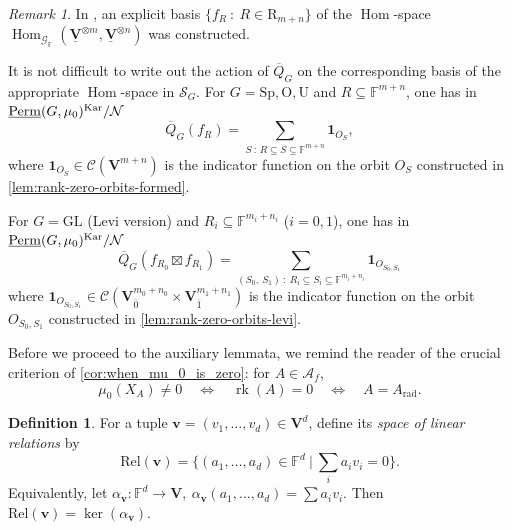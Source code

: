 \documentclass[11pt,a4paper]{amsart}
\theoremstyle{plain}%
\theoremstyle{definition}
\newtheorem{definition}[lemma]{Definition}
\theoremstyle{remark}
\newtheorem{remark}[lemma]{Remark}
\newcommand{\Hom}{\operatorname{Hom}}
\newcommand{\rk}{{\operatorname{rk}}}
\newcommand{\V}{\mathbf{V}}
\newcommand{\Perm}{\underline{{\rm Perm}}}
\newcommand{\F}{{\mathbb F}}
\newcommand{\one}{{\mathbf{1}}}
\newcommand{\Kar}{\mathrm{Kar}}
\newcommand{\rad}{\operatorname{rad}}
\newcommand{\N}{\mathcal N}
\newcommand{\boxt}{\mathbin{\boxtimes}}
\newcommand{\cC}{\mathcal{C}}
\begin{document}
\begin{remark}

In \cite{Knop, EAHGL}, an explicit basis $\{f_R~:~ R\in \mathrm{R}_{m+n}\}$ of the $\Hom$-space $\Hom_{{\mathscr{G}_{\F}}}(\underline{\V}^{\otimes m},
\underline{\V}^{\otimes n})$ was constructed. 

It is not difficult to write out the action of $\overline{Q}_G$ on the corresponding basis of the appropriate $\Hom$-space in $\mathscr{S}_G$. For $G=\mathrm{Sp},\mathrm O,\mathrm U$ and $R\subseteq \F^{m+n}$, one has in $\Perm(G, \mu_0)^{\Kar}/\N$
\begin{equation*}\label{eq:zeta-formula}
 \overline{Q}_G(f_R)=\sum_{S~:\,R\subseteq S\subseteq \F^{m+n}}\one_{O_S},
\end{equation*}
where $ \one_{O_S} \in \cC(\V^{m+n})$ is the indicator function on the orbit $O_S$ constructed in \cref{lem:rank-zero-orbits-formed}. 

For $G=\mathrm{GL}$ (Levi version) and $R_i\subseteq \F^{m_i+n_i}$ ($i=0,1$), one has in $\Perm(G, \mu_0)^{\Kar}/\N$
\begin{equation*}\label{eq:zeta-formula-product}
 \overline{Q}_G(f_{R_0}\boxt f_{R_1})
=\sum_{(S_0,~ S_1) ~:~ R_i\subseteq S_i\subseteq \F^{m_i+n_i}}
 \one_{O_{S_0,S_1}}
\end{equation*}
where $ \one_{O_{S_0,S_1}} \in \cC(\V_{\bar 0}^{ m_0+n_0}\times \V_{\bar 1}^{m_1+n_1})$ is the indicator function on the orbit $O_{S_0,S_1}$ constructed in \cref{lem:rank-zero-orbits-levi}. 


\end{remark}


Before we proceed to the auxiliary lemmata, we remind the reader of the crucial criterion of \cref{cor:when_mu_0_is_zero}: for $A\in \mathcal{A}_f$,
\begin{equation}
 \mu_0(X_A)\neq 0
 \quad\Longleftrightarrow\quad
 \rk(A)=0 \quad\Longleftrightarrow\quad A=A_{\rad}.
\end{equation}

\begin{definition}
    For a tuple $\mathbf{v} = (v_1,\ldots,v_d) \in \V^d$, define its \emph{space of linear relations} by \[ \mathrm{Rel}(\mathbf{v}) = \{ (a_1,\ldots,a_d) \in \F^d \ | \ \sum_i a_i v_i = 0 \}. \] Equivalently, let $\alpha_{\mathbf{v}} :\F^d\to \mathbf{V}, \ \alpha_{\mathbf{v}} (a_1,\ldots,a_d)  = \sum a_i v_i.$ Then $\mathrm{Rel}(\mathbf{v}) = \ker(\alpha_{\mathbf{v}})$.
\end{definition}
\end{document}
